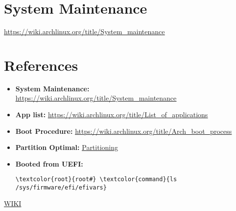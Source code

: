 \documentclass[10pt, a4paper, onecolumn, openany]{book} %
\begin{document}
\chapter{System Maintenance}
\underline{\href{https://wiki.archlinux.org/title/System\_maintenance}{https://wiki.archlinux.org/title/System\_maintenance}}


\chapter{References}
\begin{itemize}
    \item \textbf{System Maintenance:}
\newline \underline{\href{https://wiki.archlinux.org/title/System\_maintenance}{https://wiki.archlinux.org/title/System\_maintenance}}
    \item \textbf{App list:}
\newline \underline{\href{https://wiki.archlinux.org/title/List\_of\_applications}{https://wiki.archlinux.org/title/List\_of\_applications}}

    \item \textbf{Boot Procedure:}
\newline \underline{\href{https://wiki.archlinux.org/title/Arch\_boot\_process}{https://wiki.archlinux.org/title/Arch\_boot\_process}}
    \item \textbf{Partition Optimal:}
\newline \underline{\href{https://rainbow.chard.org/2013/01/30/how-to-align-partitions-for-best-performance-using-parted/}{Partitioning}}
    \item \textbf{Booted from UEFI:}
\begin{Verbatim}[commandchars=\\\{\}]
\textcolor{root}{root#} \textcolor{command}{ls /sys/firmware/efi/efivars}
\end{Verbatim}
\end{itemize}
\href{https://wiki.archlinux.org/title/General_recommendations}{WIKI}
\end{document}
